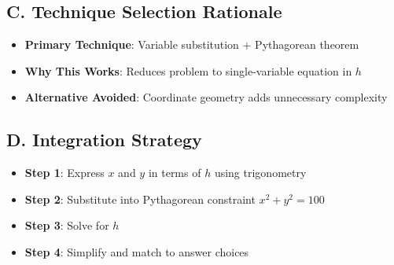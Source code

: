 \documentclass[12pt]{article}
\begin{document}
\begin{conversionbox}
\subsection*{C. Technique Selection Rationale}
\begin{itemize}[leftmargin=*]
    \item \textbf{Primary Technique}: Variable substitution + Pythagorean theorem
    \item \textbf{Why This Works}: Reduces problem to single-variable equation in $h$
    \item \textbf{Alternative Avoided}: Coordinate geometry adds unnecessary complexity
\end{itemize}

\subsection*{D. Integration Strategy}
\begin{itemize}[leftmargin=*]
    \item \textbf{Step 1}: Express $x$ and $y$ in terms of $h$ using trigonometry
    \item \textbf{Step 2}: Substitute into Pythagorean constraint $x^2 + y^2 = 100$
    \item \textbf{Step 3}: Solve for $h$
    \item \textbf{Step 4}: Simplify and match to answer choices
\end{itemize}
\end{conversionbox}
\end{document}
